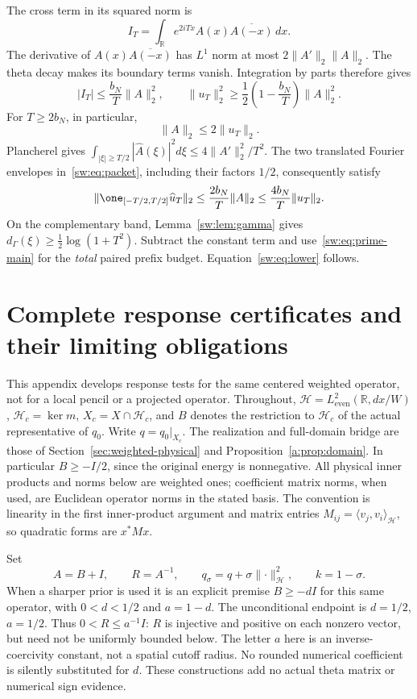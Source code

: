 \documentclass[11pt,a4paper]{article}
\numberwithin{equation}{section}
\theoremstyle{definition}\newtheorem{definition}[theorem]{Definition}
\theoremstyle{remark}\newtheorem{remark}[theorem]{Remark}
\newcommand{\R}{\mathbb R}\newcommand{\C}{\mathbb C}\newcommand{\N}{\mathbb N}
\newcommand{\Hh}{\mathcal H}\newcommand{\Hw}{\mathcal H}
\newcommand{\ip}[2]{\langle#1,#2\rangle}\newcommand{\norm}[1]{\lVert#1\rVert}\newcommand{\abs}[1]{\lvert#1\rvert}
\begin{document}
The cross term in its squared norm is
\[
 I_T=\int_\R e^{2iTx}A(x)\overline{A(-x)}\,dx.
\]
The derivative of $A(x)\overline{A(-x)}$ has $L^1$ norm at most
$2\norm{A'}_2\norm A_2$. The theta decay makes its boundary terms vanish. Integration by parts therefore gives
\[
 |I_T|\le\frac{b_N}{T}\norm A_2^2,
 \qquad
 \norm{u_T}_2^2\ge\frac12\left(1-\frac{b_N}{T}\right)\norm A_2^2.
\]
For $T\ge2b_N$, in particular,
\begin{equation}\label{sw:eq:norm-compare}
 \norm A_2\le2\norm{u_T}_2.
\end{equation}
Plancherel gives
$\int_{|\xi|\ge T/2}|\widehat A(\xi)|^2d\xi
 \le4\norm{A'}_2^2/T^2$.
The two translated Fourier envelopes in~\eqref{sw:eq:packet}, including their factors $1/2$, consequently satisfy
\begin{equation}\label{sw:eq:leakage}
 \norm{\one_{[-T/2,T/2]}\widehat u_T}_2
 \le\frac{2b_N}{T}\norm A_2
 \le\frac{4b_N}{T}\norm{u_T}_2.
\end{equation}
On the complementary band, Lemma~\ref{sw:lem:gamma} gives
$d_\Gamma(\xi)\ge\frac12\log(1+T^2)$. Subtract the constant term and use~\eqref{sw:eq:prime-main} for the \emph{total} paired prefix budget. Equation~\eqref{sw:eq:lower} follows.



\section{Complete response certificates and their limiting obligations}\label{rtc:sec:tools}
This appendix develops response tests for the same centered weighted operator,
not for a local pencil or a projected operator. Throughout,
$\Hh=L^2_{\mathrm{even}}(\R,dx/W)$, $\Hh_c=\ker m$,
$X_c=X\cap\Hh_c$, and $B$ denotes the restriction to $\Hh_c$ of the
actual representative of $q_0$. Write $q=q_0|_{X_c}$.
The realization and full-domain bridge are those of
Section~\ref{sec:weighted-physical} and Proposition~\ref{a:prop:domain}.
In particular $B\ge-I/2$, since the original energy is nonnegative.
All physical inner products and norms below are weighted ones; coefficient
matrix norms, when used, are Euclidean operator norms in the stated basis.
The convention is linearity in the first inner-product argument and matrix
entries $M_{ij}=\ip{v_j}{v_i}_{\Hh}$, so quadratic forms are $x^*Mx$.

Set
\begin{equation}\label{rtc:eq:setup}
 A=B+I,\qquad R=A^{-1},\qquad
 q_\sigma=q+\sigma\norm{\cdot}_{\Hh}^{2},\qquad k=1-\sigma.
\end{equation}
When a sharper prior is used it is an explicit premise
$B\ge-dI$ for this same operator, with $0<d<1/2$ and $a=1-d$.
The unconditional endpoint is $d=1/2$, $a=1/2$.
Thus $0<R\le a^{-1}I$: $R$ is injective and positive on each nonzero
vector, but need not be uniformly bounded below. The letter $a$ here is
an inverse-coercivity constant, not a spatial cutoff radius.
No rounded numerical coefficient is silently substituted for $d$.
These constructions add no actual theta matrix or numerical sign evidence.
\end{document}
